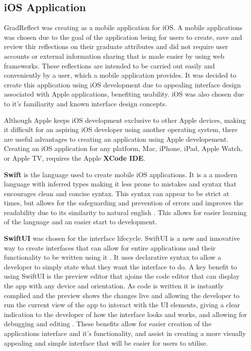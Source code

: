 \documentclass{l4proj}
\begin{document}
\subsection{iOS Application}

GradReflect was creating as a mobile application for iOS. A mobile applications was chosen
due to the goal of the application being for users to create, save and review thir reflections on their graduate attributes and did not require user accounts 
or external information sharing that is made easier by using web frameworks. These reflections are intended to be carried out easily and conveniently by a user,
which a mobile application provides. It was decided to create this application using iOS development due to appealing interface design associated with Apple 
applications, benefiting usability. iOS was also chosen due to it's familiarity and known interface design concepts.

Although Apple keeps iOS development exclusive to other Apple devices, making it difficult for an aspiring iOS developer using another operating system, 
there are useful advantages to creating an application using Apple developement. Creating an iOS application for any platform, Mac, iPhone, iPad, Apple Watch, 
or Apple TV, requires the Apple \textbf{XCode IDE}. 

\textbf{Swift} is the language used to create mobile iOS applications. It is a a modern language with inferred types making it less prone to mistakes and syntax 
that encourages clean and concise syntax. This syntax can appear to be strict at times, but allows for the safeguarding and prevention of errors and improves 
the readability due to its similarity to natural english \citep{altexsoft_swift_2021}. This allows for easier learning of the language and an easier start 
to development.

\textbf{SwiftUI} was chosen for the interface lifecycle. SwiftUI is a new and innovative way to create interfaces that can allow for entire applications and 
their functionality to be written using it \citep{apple_developer_xcode_2021}. It uses declarative syntax to allow a developer to simply state what they want 
the interface to do. A key benefit to using SwiftUI is the preview editor that ajoins the code editor that can display the app with any device and orientation. 
As code is written it is instantly complied and the preview shows the changes live and allowing the developer to run the current view of the app to interact 
with the UI elements, giving a clear indication to the developer of how the interface looks and works, and allowing for debugging and editing 
\citep{apple_swiftui_2021}. These benefits allow for easier creation of the applications interface and it's functionality, and assist in creating a more 
visually appealing and simple interface that will be easier for users to utilise.
\end{document}
